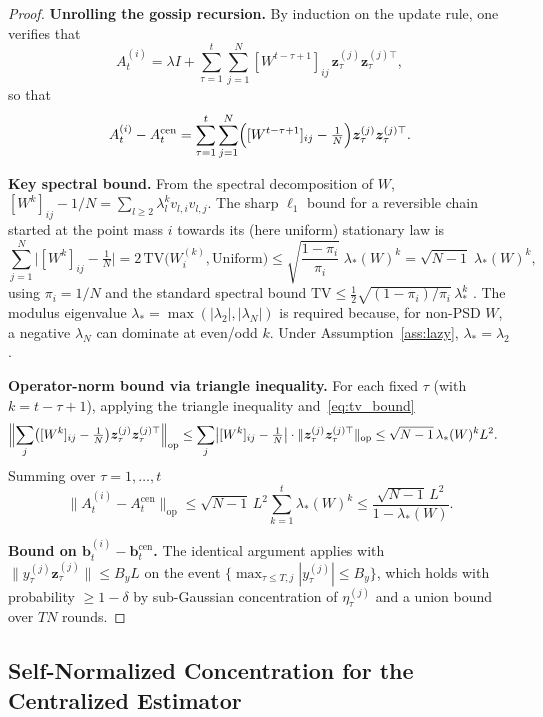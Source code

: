 \documentclass[11pt]{article}
\begin{document}
\begin{proof}
\textbf{Unrolling the gossip recursion.}
By induction on the update rule, one verifies that
\[
A_t^{(i)}=\lambda I+\sum_{\tau=1}^t\sum_{j=1}^N
[W^{t-\tau+1}]_{ij}\,\bm{z}_\tau^{(j)}\bm{z}_\tau^{(j)\top},
\]
so that
\[
A_t^{(i)}-A_t^{\mathrm{cen}}
=\sum_{\tau=1}^t\sum_{j=1}^N
\Bigl([W^{t-\tau+1}]_{ij}-\tfrac{1}{N}\Bigr)
\bm{z}_\tau^{(j)}\bm{z}_\tau^{(j)\top}.
\]

\textbf{Key spectral bound.}
From the spectral decomposition of $W$,
$[W^k]_{ij}-1/N=\sum_{l\geq 2}\lambda_l^k v_{l,i}v_{l,j}$.
The sharp $\ell_1$ bound for a reversible chain started at the point
mass $i$ towards its (here uniform) stationary law is
\begin{equation}
\sum_{j=1}^N\bigl|[W^k]_{ij}-\tfrac{1}{N}\bigr|
=2\,\mathrm{TV}\!\bigl(W_i^{(k)},\mathrm{Uniform}\bigr)
\leq\sqrt{\frac{1-\pi_i}{\pi_i}}\;\lambda_*(W)^k
=\sqrt{N-1}\;\lambda_*(W)^k,
\label{eq:tv_bound}
\end{equation}
using $\pi_i=1/N$ and the standard spectral bound
$\mathrm{TV}\leq\tfrac12\sqrt{(1-\pi_i)/\pi_i}\,\lambda_*^k$
\citep[Prop.~12.19]{levin2017}.
The modulus eigenvalue $\lambda_*=\max(|\lambda_2|,|\lambda_N|)$ is
required because, for non-PSD $W$, a negative $\lambda_N$ can dominate
at even/odd $k$. Under Assumption~\ref{ass:lazy}, $\lambda_*=\lambda_2$.

\textbf{Operator-norm bound via triangle inequality.}
For each fixed $\tau$ (with $k=t-\tau+1$), applying the triangle
inequality and~\eqref{eq:tv_bound} \begin{align*}
\Bigl\|\sum_{j}\bigl([W^k]_{ij}-\tfrac{1}{N}\bigr)
\bm{z}_\tau^{(j)}\bm{z}_\tau^{(j)\top}\Bigr\|_{\mathrm{op}}
&\leq\sum_{j}\bigl|[W^k]_{ij}-\tfrac{1}{N}\bigr|\cdot
\|\bm{z}_\tau^{(j)}\bm{z}_\tau^{(j)\top}\|_{\mathrm{op}}
\leq\sqrt{N-1}\,\lambda_*(W)^k L^2.
\end{align*}
Summing over $\tau=1,\dots,t$ \[
\|A_t^{(i)}-A_t^{\mathrm{cen}}\|_{\mathrm{op}}
\leq\sqrt{N-1}\,L^2\sum_{k=1}^t\lambda_*(W)^k
\leq\frac{\sqrt{N-1}\,L^2}{1-\lambda_*(W)}.
\]

\textbf{Bound on $\bm{b}_t^{(i)}-\bm{b}_t^{\mathrm{cen}}$.}
The identical argument applies with
$\|y_\tau^{(j)}\bm{z}_\tau^{(j)}\|\leq B_y L$ on the event
$\{\max_{\tau\leq T,j}|y_\tau^{(j)}|\leq B_y\}$, which holds with
probability $\geq 1-\delta$ by sub-Gaussian concentration of
$\eta_\tau^{(j)}$ and a union bound over $TN$ rounds.
\end{proof}

\subsection{Self-Normalized Concentration for the Centralized Estimator}
\end{document}
